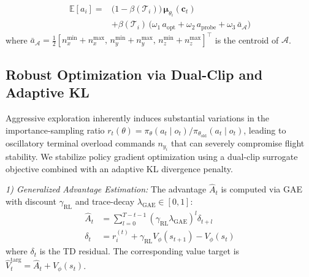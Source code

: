 \documentclass[lettersize,journal]{IEEEtran}
\providecommand{\DIFadd}[1]{{\protect\color{blue} #1}} %
\providecommand{\DIFdel}[1]{} %
\providecommand{\DIFaddbegin}{} %
\providecommand{\DIFaddend}{} %
\providecommand{\DIFdelbegin}{} %
\providecommand{\DIFdelend}{} %
\begin{document}
\begin{equation}
\label{eq:expected_action}
\begin{split}
\mathbb{E}[a_i] =& \bigl(1-\beta(\mathcal{T}_i)\bigr)\,\boldsymbol{\mu}_{\theta_i}(\mathbf{c}_t) \\
&+ \beta(\mathcal{T}_i)\,\bigl(\omega_1\,a_{\mathrm{opt}} + \omega_2\,a_{\mathrm{probe}} + \omega_3\,\bar{a}_{\mathcal{A}}\bigr)
\end{split}
\end{equation}
where
\DIFdelbegin \DIFdel{$\bar{a}_{\mathcal{A}} = \frac{1}{2}[n_x^{\min}+n_x^{\max},\; n_y^{\min}+n_y^{\max}]^\top$ }\DIFdelend \DIFaddbegin \DIFadd{\(\bar{a}_{\mathcal{A}}=\frac{1}{2}
[n_x^{\min}+n_x^{\max},\,n_y^{\min}+n_y^{\max},\,
n_z^{\min}+n_z^{\max}]^\top\) }\DIFaddend is the centroid of \DIFdelbegin \DIFdel{$\mathcal{A}$}\DIFdelend \DIFaddbegin \DIFadd{\(\mathcal{A}\)}\DIFaddend .

\subsection{Robust Optimization via Dual-Clip and Adaptive KL}
\label{subsec:dual_clip_kl}

Aggressive exploration inherently induces substantial variations in the importance-sampling ratio $r_t(\theta) = \pi_\theta(a_t \mid o_t) / \pi_{\theta_{\mathrm{old}}}(a_t \mid o_t)$, leading to oscillatory terminal overload commands $n_{y_i}$ that can severely compromise flight stability. We stabilize policy gradient optimization using a dual-clip surrogate objective combined with an adaptive KL divergence penalty.

\emph{1) Generalized Advantage Estimation:} The advantage $\hat{A}_t$ is computed via GAE with discount $\gamma_{\mathrm{RL}}$ and trace-decay $\lambda_{\mathrm{GAE}} \in [0,1]$:
\begin{align}
\hat{A}_t &= \sum_{l=0}^{T-t-1} (\gamma_{\mathrm{RL}}\lambda_{\mathrm{GAE}})^l \delta_{t+l} \label{eq:gae_A} \\
\delta_t &= r_i^{(t)} + \gamma_{\mathrm{RL}} V_\phi(s_{t+1}) - V_\phi(s_t) \label{eq:gae_delta}
\end{align}
where $\delta_t$ is the TD residual. The corresponding value target is $\hat{V}_t^{\mathrm{targ}} = \hat{A}_t + V_\phi(s_t)$.
\end{document}
